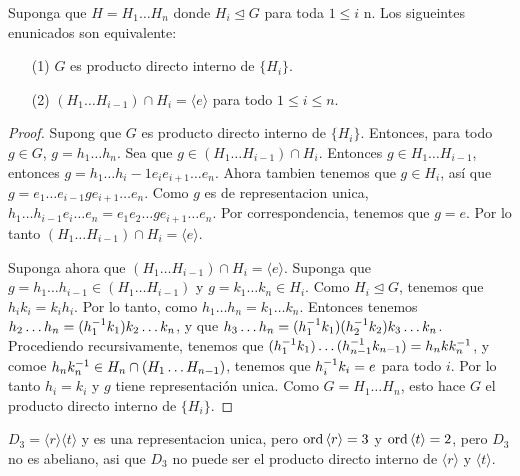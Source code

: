 \begin{lemma}\label{lemma_6.22}
    Suponga que $H=H_1 \dots H_n$ donde $H_i \unlhd G$ para toda $1 \leq i$ \leq
    n. Los sigueintes enunicados son equivalente:
    \begin{enumerate}
        \item[(1)] $G$ es producto directo interno de  $\{H_i\}$.

        \item[(2)] $(H_1 \dots H_{i-1}) \cap H_i=\langle e \rangle$ para todo $1
            \leq i \leq n$.
    \end{enumerate}
\end{lemma}
\begin{proof}
    Supong  que $G$ es producto directo interno de  $\{H_i\}$. Entonces, para
    todo $g \in G$,  $g=h_1 \dots h_n$. Sea que $g \in (H_1 \dots H_{i-1}) \cap

    H_i$. Entonces $g \in H_1 \dots H_{i-1}$, entonces $g=h_1 \dots
    h_i-1e_ie_{i+1} \dots e_n$. Ahora tambien tenemos que $g \in H_i$, as\'i que
     $g=e_1 \dots e_{i-1}ge_{i+1} \dots e_n$. Como $g$ es de representacion
     unica, $h_1 \dots h_{i-1}e_i \dots e_n=e_1e_2 \dots ge_{i+1} \dots e_n$.
     Por correspondencia, tenemos que $g=e$. Por lo tanto  $(H_1 \dots H_{i-1})
     \cap H_i=\langle e \rangle$.

     Suponga ahora que $(H_1 \dots H_{i-1}) \cap H_i=\langle e \rangle$.
     Suponga que $g=h_1 \dots h_{i-1} \in (H_1 \dots H_{i-1})$ y $g=k_1 \dots
     k_n \in H_i$. Como $H_i \unlhd G$, tenemos que  $h_ik_i=k_ih_i$. Por lo
     tanto, como  $h_1 \dots h_n=k_1 \dots k_n$. Entonces tenemos $h_2 \dots
     h_n=(h_1^{-1}k_1)k_2 \dots k_n$, y que $h_3 \dots
     h_n=(h_1^{-1}k_1)(h_2^{-1}k_2)k_3 \dots k_n$. Procediendo recursivamente,
     tenemos que  $(h_1^{-1}k_1) \dots (h_{n-1}^{-1}k_{n-1})=h_nkk_n^{-1}$, y
     comoe $h_nk_n^{-1} \in H_n \cap (H_1 \dots H_{n-1})$, tenemos que
     $h_i^{-1}k_i=e$ para todo $i$. Por lo tanto  $h_i=k_i$ y  $g$ tiene
     representaci\'on unica. Como  $G=H_1 \dots H_n$, esto hace $G$ el producto
     directo interno de  $\{H_i\}$.
\end{proof}

\begin{example}\label{}
        $D_3=\langle r \rangle\langle t \rangle$ y es una
        representacion unica, pero $\operatorname{ord}{\langle r \rangle}=3$ y
        $\operatorname{ord}{\langle t \rangle}=2$, pero $D_3$ no es abeliano, asi que
        $D_3$ no puede ser el producto directo interno de $\langle r
        \rangle$ y $\langle t\rangle$.
\end{example}

